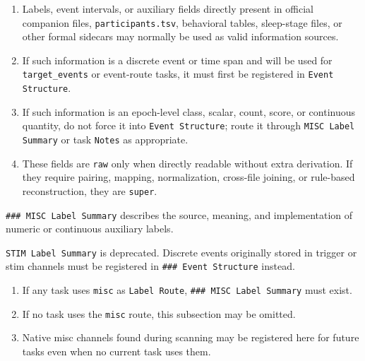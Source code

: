 \begin{tcolorbox}
\smallskip{}\par\smallskip

\begin{enumerate}[leftmargin=1.5em,noitemsep,topsep=2pt]
\item Labels, event intervals, or auxiliary fields directly present in official companion files, \texttt{participants.tsv}, behavioral tables, sleep-stage files, or other formal sidecars may normally be used as valid information sources.
\item If such information is a discrete event or time span and will be used for \texttt{target\_events} or event-route tasks, it must first be registered in \texttt{Event Structure}.
\item If such information is an epoch-level class, scalar, count, score, or continuous quantity, do not force it into \texttt{Event Structure}; route it through \texttt{MISC Label Summary} or task \texttt{Notes} as appropriate.
\item These fields are \texttt{raw} only when directly readable without extra derivation. If they require pairing, mapping, normalization, cross-file joining, or rule-based reconstruction, they are \texttt{super}.
\end{enumerate}

\smallskip{}\par\smallskip

\noindent \texttt{\#\#\# MISC Label Summary} describes the source, meaning, and implementation of numeric or continuous auxiliary labels.\par\smallskip

\noindent \texttt{STIM Label Summary} is deprecated. Discrete events originally stored in trigger or stim channels must be registered in \texttt{\#\#\# Event Structure} instead.\par\smallskip

\smallskip{}\par\smallskip

\begin{enumerate}[leftmargin=1.5em,noitemsep,topsep=2pt]
\item If any task uses \texttt{misc} as \texttt{Label Route}, \texttt{\#\#\# MISC Label Summary} must exist.
\item If no task uses the \texttt{misc} route, this subsection may be omitted.
\item Native misc channels found during scanning may be registered here for future tasks even when no current task uses them.
\end{enumerate}


\end{tcolorbox}
